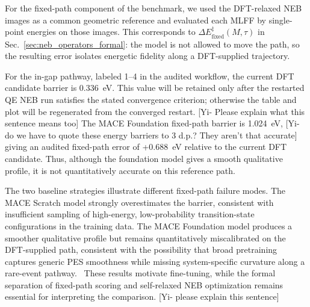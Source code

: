 \documentclass[pdflatex,sn-mathphys-num]{sn-jnl}%
\providecommand{\reviewermap}[3]{}
\theoremstyle{thmstyleone}%
\theoremstyle{thmstyletwo}%
\theoremstyle{thmstylethree}%
\begin{document}
For the fixed-path component of the benchmark, we used the DFT-relaxed NEB images as a common geometric reference and evaluated each MLFF by single-point energies on those images. This corresponds to $\Delta E_{\mathrm{fixed}}^{\ddagger}(M,\tau)$ in Sec.~\ref{sec:neb_operators_formal}: the model is not allowed to move the path, so the resulting error isolates energetic fidelity along a DFT-supplied trajectory.

\reviewermap{REV-A1}{partial}{Fig. 3d is fixed-geometry DFT-path scoring; current 1-4 DFT reference candidate is 0.336050 eV; Foundation fixed-path error is +0.688246 eV.}

For the in-gap pathway, labeled 1--4 in the audited workflow, the current DFT candidate barrier is 0.336~eV. This value will be retained only after the restarted QE NEB run satisfies the stated convergence criterion; otherwise the table and plot will be regenerated from the converged restart. [Yi- Please explain what this sentence means too] The MACE Foundation fixed-path barrier is 1.024~eV, [Yi- do we have to quote these energy barriers to 3 d.p.? They aren't that accurate] giving an audited fixed-path error of +0.688~eV relative to the current DFT candidate. Thus, although the foundation model gives a smooth qualitative profile, it is not quantitatively accurate on this reference path.




The two baseline strategies illustrate different fixed-path failure modes. The MACE Scratch model strongly overestimates the barrier, consistent with insufficient sampling of high-energy, low-probability transition-state configurations in the training data. The MACE Foundation model produces a smoother qualitative profile but remains quantitatively miscalibrated on the DFT-supplied path, consistent with the possibility that broad pretraining captures generic PES smoothness while missing system-specific curvature along a rare-event pathway.~\citep{deng2025softening} 
These results motivate fine-tuning, while the formal separation of fixed-path scoring and self-relaxed NEB optimization remains essential for interpreting the comparison. [Yi- please explain this sentence]
\end{document}

